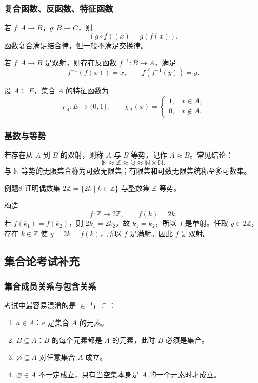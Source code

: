 \subsubsection{复合函数、反函数、特征函数}

若 \(f:A\to B\)，\(g:B\to C\)，则
\[
(g\circ f)(x)=g(f(x)).
\]
函数复合满足结合律，但一般不满足交换律。

若 \(f:A\to B\) 是双射，则存在反函数 \(f^{-1}:B\to A\)，满足
\[
f^{-1}(f(x))=x,\qquad f(f^{-1}(y))=y.
\]

设 \(A\subseteq E\)，集合 \(A\) 的特征函数为
\[
\chi_A:E\to\{0,1\},\qquad
\chi_A(x)=
\begin{cases}
1,&x\in A,\\
0,&x\notin A.
\end{cases}
\]

\subsubsection{基数与等势}

若存在从 \(A\) 到 \(B\) 的双射，则称 \(A\) 与 \(B\) 等势，记作 \(A\approx B\)。常见结论：
\[
\mathbb{N}\approx\mathbb{Z}\approx\mathbb{Q}\approx\mathbb{N}\times\mathbb{N}.
\]
与 \(\mathbb{N}\) 等势的无限集合称为可数无限集；有限集和可数无限集统称至多可数集。

\begin{question}{例题8}
	证明偶数集 \(2\mathbb{Z}=\{2k\mid k\in\mathbb{Z}\}\) 与整数集 \(\mathbb{Z}\) 等势。
	
	\begin{solution}
	构造
	\[
	f:\mathbb{Z}\to2\mathbb{Z},\qquad f(k)=2k.
	\]
	若 \(f(k_1)=f(k_2)\)，则 \(2k_1=2k_2\)，故 \(k_1=k_2\)，所以 \(f\) 是单射。任取 \(y\in2\mathbb{Z}\)，存在 \(k\in\mathbb{Z}\) 使 \(y=2k=f(k)\)，所以 \(f\) 是满射。因此 \(f\) 是双射。
	\end{solution}
\end{question}

\subsection{集合论考试补充}

\subsubsection{集合成员关系与包含关系}

考试中最容易混淆的是 \(\in\) 与 \(\subseteq\)：
\begin{enumerate}
	\item \(a\in A\)：\(a\) 是集合 \(A\) 的元素。
	\item \(B\subseteq A\)：\(B\) 的每个元素都是 \(A\) 的元素，此时 \(B\) 必须是集合。
	\item \(\varnothing\subseteq A\) 对任意集合 \(A\) 成立。
	\item \(\varnothing\in A\) 不一定成立，只有当空集本身是 \(A\) 的一个元素时才成立。
\end{enumerate}

